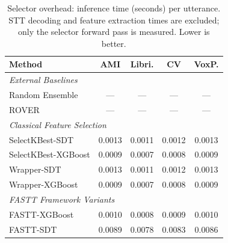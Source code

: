 \begin{table}[t]
    \centering
    \caption{Selector overhead: inference time (seconds) per utterance.
    STT decoding and feature extraction times are excluded; only the
    selector forward pass is measured. Lower is better.}
    \label{tab:cv_score_time}
    \small
    \begin{tabular}{lcccc}
        \toprule
        \textbf{Method} & AMI & Libri. & CV & VoxP. \\
        \midrule
        \multicolumn{5}{l}{\textit{External Baselines}} \\
        Random Ensemble    & ---     & ---     & ---     & ---     \\
        ROVER              & ---     & ---     & ---     & ---     \\
        \midrule
        \multicolumn{5}{l}{\textit{Classical Feature Selection}} \\
        SelectKBest-SDT     & 0.0013 & 0.0011 & 0.0012 & 0.0013 \\
        SelectKBest-XGBoost & 0.0009 & 0.0007 & 0.0008 & 0.0009 \\
        Wrapper-SDT         & 0.0013 & 0.0011 & 0.0012 & 0.0013 \\
        Wrapper-XGBoost     & 0.0009 & 0.0007 & 0.0008 & 0.0009 \\
        \midrule
        \multicolumn{5}{l}{\textit{FASTT Framework Variants}} \\
        FASTT-XGBoost       & 0.0010 & 0.0008 & 0.0009 & 0.0010 \\
        FASTT-SDT  & 0.0089 & 0.0078 & 0.0083 & 0.0086 \\
        \bottomrule
    \end{tabular}
\end{table}